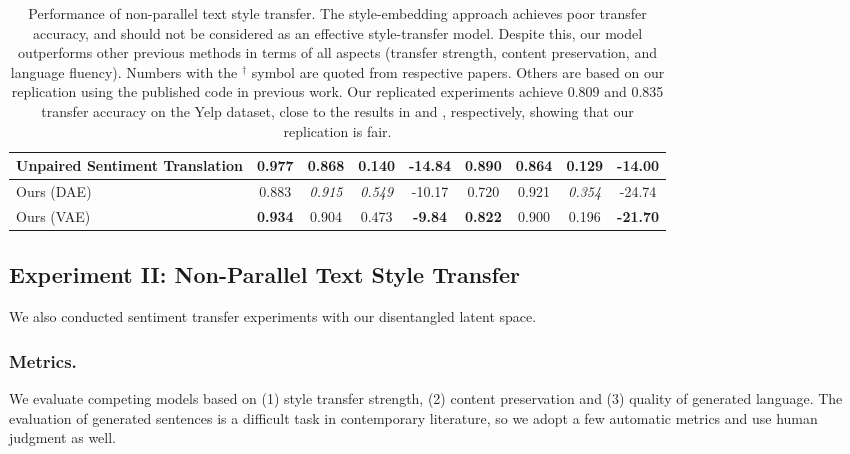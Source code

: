 \documentclass[letterpaper]{article} %
\begin{document}
\begin{table}[!t]
{\begin{tabular}{|l||c|c|c|c||c|c|c|c| }
			\hline
			Unpaired Sentiment Translation \cite{xu2018unpaired} & 0.977                                       & 0.868                                        & 0.140            & -14.84            & 0.890             & 0.864                   & 0.129            & -14.00            \\
			\hline
			Ours (DAE)                                           & 0.883                                       & \textit{0.915}                               & \textit{0.549}   & -10.17            & 0.720             & 0.921                   & \textit{0.354}   & -24.74            \\
			\hline
			Ours (VAE)                                           & \textbf{0.934}                              & 0.904                                        & {0.473}          & \textbf{-9.84}    & \textbf{0.822}    & 0.900                   & 0.196            & \textbf{-21.70}   \\
			\hline
		\end{tabular}}\vspace{-.2cm}
	\caption{Performance of non-parallel text style transfer. The style-embedding approach achieves poor transfer accuracy, and should not be considered as an effective style-transfer model. Despite this, our model outperforms other previous methods in terms of all aspects (transfer strength, content preservation, and language fluency). Numbers with the $^\dag$ symbol are quoted from respective papers. Others are based on our replication using the published code in previous work. Our replicated experiments achieve 0.809 and 0.835 transfer accuracy on the Yelp dataset, close to the results in \citet{shen2017style} and \citet{zhao2018adversarially}, respectively, showing that our replication is fair.}\vspace{-.2cm}
	\label{tab:yelp-comparison-previous}
\end{table}


\subsection{Experiment II: Non-Parallel Text Style Transfer}
We also conducted sentiment transfer experiments with our disentangled latent space.

\subsubsection{Metrics.} We evaluate competing models based on (1) style transfer strength, (2) content preservation and (3) quality of generated language. The evaluation of generated sentences is a difficult task in contemporary literature, so we adopt a few automatic metrics and use human judgment as well.
\end{document}

